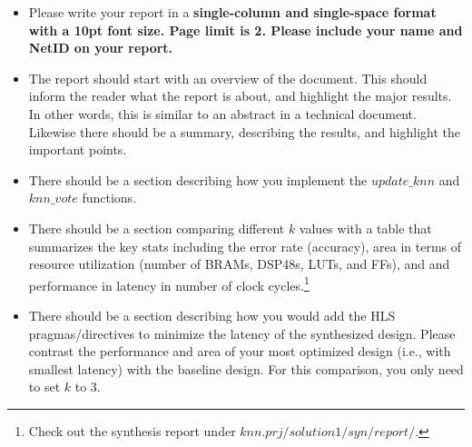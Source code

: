 \documentclass[paper=letter, fontsize=10pt]{scrartcl} %
\numberwithin{equation}{section} %
\numberwithin{figure}{section} %
\numberwithin{table}{section} %
\begin{document}
\begin{itemize}
\item Please write your report in a \textbf{single-column and single-space format with a 10pt font size. Page limit is 2. Please include your name and NetID on your report.}

\item The report should start with an overview of the document. This should inform the reader what the report is about, and highlight the major results. In other words, this is similar to an abstract in a technical document. Likewise there should be a summary, describing the results, and highlight the important points.

\item There should be a section describing how you implement the $update\_knn$ and $knn\_vote$ functions.

\item There should be a section comparing different $k$ values with a table that summarizes the key stats including the error rate (accuracy), area in terms of resource utilization (number of BRAMs, DSP48s, LUTs, and FFs), and and performance in latency in number of clock cycles.\footnote{Check out the synthesis report under $knn.prj/solution1/syn/report/$.} 

\item There should be a section describing how you would add the HLS pragmas/directives to minimize the latency of the synthesized design. Please contrast the performance and area of your most optimized design (i.e., with smallest latency) with the baseline design. For this comparison, you only need to set $k$ to 3. 




\end{itemize}
\end{document}
